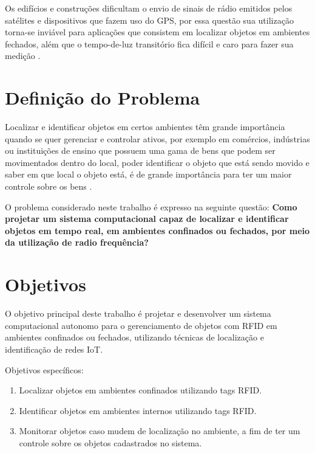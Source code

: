 \par
Os edifícios e construções dificultam o envio de sinais de rádio emitidos pelos satélites e dispositivos que fazem uso do GPS, 
por essa questão sua utilização torna-se inviável para aplicações que consistem em localizar objetos em ambientes fechados, 
além que o tempo-de-luz transitório fica difícil e caro para fazer sua medição \cite{rfid2009review}.

\section{Definição do Problema}

Localizar e identificar objetos em certos ambientes têm grande importância quando se quer gerenciar e controlar ativos, 
por exemplo em comércios, indústrias ou instituições de ensino que possuem uma gama de bens que podem ser movimentados dentro do local, 
poder identificar o objeto que está sendo movido e saber em que local o objeto está, é de grande importância para ter um maior 
controle sobre os bens \cite{realtimeRFID2016}. 

\par
O problema considerado neste trabalho é expresso na seguinte questão: 
\textbf{Como projetar um sistema computacional capaz de localizar e identificar objetos em tempo real, em ambientes confinados ou fechados,  
por meio da utilização de radio frequência?}

\section{Objetivos}
O objetivo principal deste trabalho é projetar e desenvolver um sistema computacional autonomo para o gerenciamento de objetos com RFID 
em ambientes confinados ou fechados, utilizando técnicas de localização e identificação de redes IoT.


Objetivos específicos:
\begin{enumerate}

    \item Localizar objetos em ambientes confinados utilizando tags RFID.
    
    \item Identificar objetos em ambientes internos utilizando tags RFID.
    
    \item Monitorar objetos caso mudem de localização no ambiente, a fim de ter um controle sobre os objetos cadastrados no sistema.
    
\end{enumerate}


